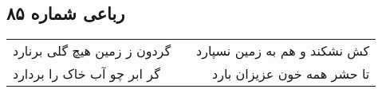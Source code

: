 \begin{center}
\section*{رباعی شماره ۸۵}
\label{sec:sh085}
\begin{longtable}{l p{0.5cm} r}
گردون ز زمین هیچ گلی برنارد
&&
کش نشکند و هم به زمین نسپارد
\\
گر ابر چو آب خاک را بردارد
&&
تا حشر همه خون عزیزان بارد
\\
\end{longtable}
\end{center}
